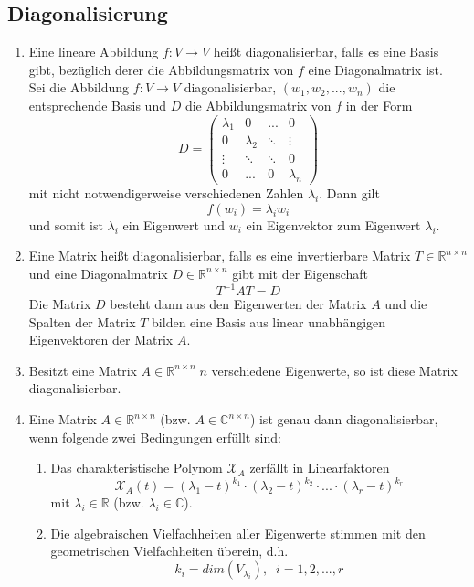 \documentclass[a4paper,twocolumn,10pt]{article}
\begin{document}
\subsection{Diagonalisierung}
\begin{enumerate}[label=$\bullet$]
\item Eine lineare Abbildung $f:V\rightarrow V$ heißt diagonalisierbar, falls es eine Basis gibt, bezüglich derer die Abbildungsmatrix von $f$ eine Diagonalmatrix ist.\\
Sei die Abbildung $f:V\rightarrow V$ diagonalisierbar, $(w_1,w_2,...,w_n)$ die entsprechende Basis und $D$ die Abbildungsmatrix von $f$ in der Form
\begin{equation*}
D=\begin{pmatrix}\lambda_1 & 0 & ... & 0 \\ 0 & \lambda_2 & \ddots & \vdots \\ \vdots & \ddots & \ddots & 0 \\ 0 & ... & 0 & \lambda_n\end{pmatrix}
\end{equation*}
mit nicht notwendigerweise verschiedenen Zahlen $\lambda_i$. Dann gilt
\begin{equation*}
f(w_i)=\lambda_i w_i
\end{equation*}
und somit ist $\lambda_i$ ein Eigenwert und $w_i$ ein Eigenvektor zum Eigenwert $\lambda_i$.
\item Eine Matrix heißt diagonalisierbar, falls es eine invertierbare Matrix $T\in\mathbb{R}^{n\times n}$ und eine Diagonalmatrix $D\in\mathbb{R}^{n\times n}$ gibt mit der Eigenschaft
\begin{equation*}
T^{-1}AT=D
\end{equation*}
Die Matrix $D$ besteht dann aus den Eigenwerten der Matrix $A$ und die Spalten der Matrix $T$ bilden eine Basis aus linear unabhängigen Eigenvektoren der Matrix $A$.
\item Besitzt eine Matrix $A\in\mathbb{R}^{n\times n}\;n$ verschiedene Eigenwerte, so ist diese Matrix diagonalisierbar.
\item Eine Matrix $A\in\mathbb{R}^{n\times n}$ (bzw. $A\in\mathbb{C}^{n\times n}$) ist genau dann diagonalisierbar, wenn folgende zwei Bedingungen erfüllt sind:
\begin{enumerate}
\item Das charakteristische Polynom $\mathcal{X}_A$ zerfällt in Linearfaktoren
\begin{equation*}
\mathcal{X}_A(t)=(\lambda_1 -t)^{k_1}\cdot (\lambda_2 -t)^{k_2}\cdot ...\cdot(\lambda_r -t)^{k_r}
\end{equation*}
mit $\lambda_i\in\mathbb{R}$ (bzw. $\lambda_i\in\mathbb{C}$).
\item Die algebraischen Vielfachheiten aller Eigenwerte stimmen mit den geometrischen Vielfachheiten überein, d.h.
\begin{equation*}
k_i=dim(V_{\lambda_i}),\;\;i=1,2,...,r
\end{equation*}
\end{enumerate}
\end{enumerate}
\end{document}
